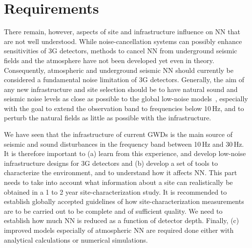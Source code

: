 \section{Requirements}
There remain, however, aspects of site and infrastructure influence on \ac{NN} that are not well understood. 
While noise-cancellation systems can possibly enhance sensitivities of \ac{3G} detectors, methods to cancel \ac{NN} from underground seismic fields and the atmosphere have not been developed yet even in theory. Consequently, atmospheric and underground seismic \ac{NN} should currently be considered a fundamental noise limitation of \ac{3G} detectors. Generally, the aim of any new infrastructure and site selection should be to have natural sound and seismic noise levels as close as possible to the global low-noise models~\cite{Pet1993}, especially with the goal to extend the observation band to frequencies below 10\,Hz, and to perturb the natural fields as little as possible with the infrastructure. 

We have seen that the infrastructure of current \acp{GWD} is the main source of seismic and sound disturbances in the frequency band between 10\,Hz and 30\,Hz. It is therefore important to (a) learn from this experience, and develop low-noise infrastructure designs for \ac{3G} detectors and (b) develop a set of tools to characterize the environment, and to understand how it affects \ac{NN}. This part needs to take into account what information about a site can realistically be obtained in a 1 to 2 year site-characterization study. It is recommended to establish globally accepted guidelines of how site-characterization measurements are to be carried out to be complete and of sufficient quality. We need to establish how much \ac{NN} is reduced as a function of detector depth. Finally, (c) improved models especially of atmospheric \ac{NN} are required done either with analytical calculations or numerical simulations.

